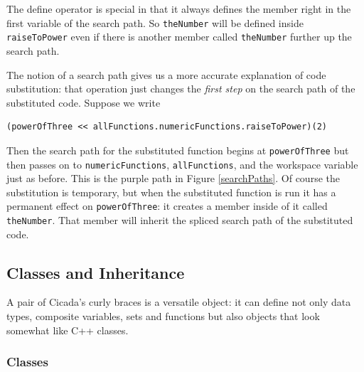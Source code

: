 \documentclass{article}
\newenvironment{code}{
       \begin{list}{}{
               \setlength{\leftmargin}{.4in}
               \setlength{\rightmargin}{0in}
               \setlength{\topsep}{.2in}
       }
       \small
       \item[] }
       { \end{list}   }
\begin{document}
The define operator is special in that it always defines the member right in the first variable of the search path.  So \verb#theNumber# will be defined inside \verb#raiseToPower# even if there is another member called \verb#theNumber# further up the search path.

The notion of a search path gives us a more accurate explanation of code substitution:  that operation just changes the \emph{first step} on the search path of the substituted code.  Suppose we write

\begin{code} \begin{verbatim}
(powerOfThree << allFunctions.numericFunctions.raiseToPower)(2)
\end{verbatim} \end{code}

\noindent Then the search path for the substituted function begins at \verb#powerOfThree# but then passes on to \verb#numericFunctions#, \verb#allFunctions#, and the workspace variable just as before.  This is the purple path in Figure \ref{searchPaths}.  Of course the substitution is temporary, but when the substituted function is run it has a permanent effect on \verb#powerOfThree#:  it creates a member inside of it called \verb#theNumber#.  That member will inherit the spliced search path of the substituted code.










\subsection{Classes and Inheritance}

A pair of Cicada's curly braces is a versatile object:  it can define not only data types, composite variables, sets and functions but also objects that look somewhat like C++ classes.







\subsubsection{Classes}
\end{document}

